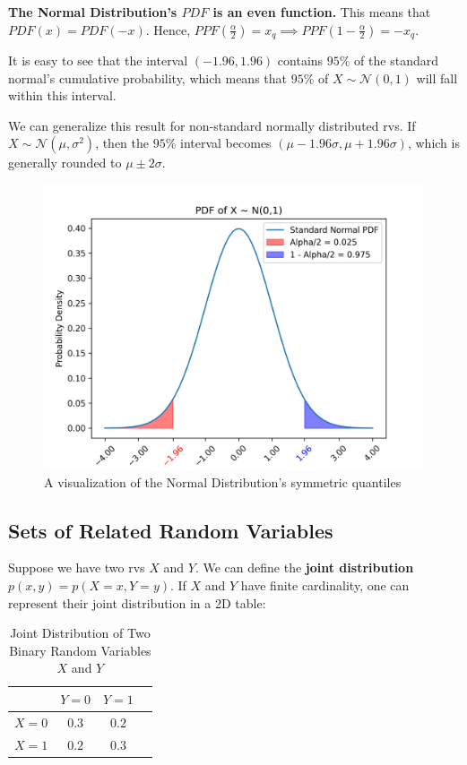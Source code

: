 \documentclass{article}
\begin{document}
\textbf{The Normal Distribution's $PDF$ is an even function.} This means that $PDF(x) = PDF(-x)$. Hence, $PPF(\frac{\alpha}{2})  = x_q \implies PPF(1 - \frac{\alpha}{2}) = -x_q$.

It is easy to  see that the interval $(-1.96, 1.96)$ contains $95\%$ of the standard normal's cumulative probability, which means that $95\%$ of $X \sim \mathcal{N}(0, 1)$ will fall within this interval.

We can generalize this result for non-standard normally distributed rvs. If  $X \sim \mathcal{N}(\mu, \sigma^2)$, then the $95\%$ interval becomes $(\mu - 1.96\sigma, \mu + 1.96\sigma)$, which is generally rounded to $\mu \pm2\sigma$.

\begin{figure}[h] 
	\centering
	\includegraphics[width=\linewidth]{images/standard_normal_pdf.png}
	\caption{A visualization of the Normal Distribution's symmetric quantiles}
	\label{fig:standard_normal_pdf}
\end{figure}

\subsection{Sets of Related Random Variables}

Suppose we have two rvs $X$ and $Y$. We can define the \textbf{joint distribution} $p(x,y) = p(X = x, Y= y)$. If  $X$ and $Y$ have finite cardinality, one can represent their joint distribution in a 2D table:

\begin{table}[H]
	\centering
	\caption{Joint Distribution of Two Binary Random Variables $X$ and $Y$}
	\begin{tabular}{|c|c|c|c|}
		\hline
		& $Y = 0$ & $Y =  1$  \\ \hline
		$X = 0$ & $0.3$  & $0.2$  \\ \hline
		$X = 1$ & $0.2$ & $0.3$ \\ \hline
	\end{tabular}
\end{table}
\end{document}
